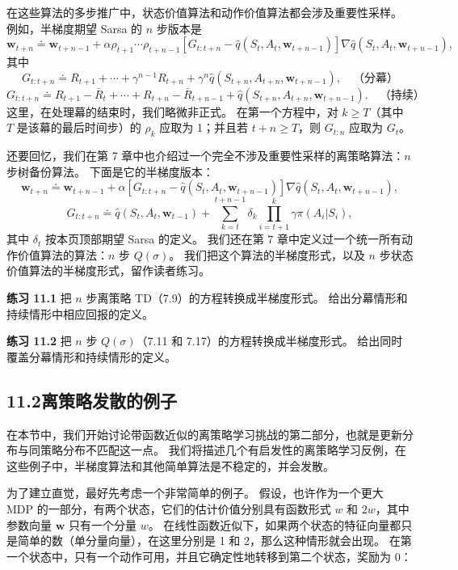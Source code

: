 \documentclass[UTF8,12pt,a4paper,fontset=fandol]{ctexart}
\begin{document}
在这些算法的多步推广中，状态价值算法和动作价值算法都会涉及重要性采样。
例如，半梯度期望 Sarsa 的 $n$ 步版本是
\begin{equation}
\mathbf{w}_{t+n}\doteq \mathbf{w}_{t+n-1}
+\alpha\rho_{t+1}\cdots\rho_{t+n-1}\left[G_{t:t+n}-\hat q(S_t,A_t,\mathbf{w}_{t+n-1})\right]\nabla\hat q(S_t,A_t,\mathbf{w}_{t+n-1}),
\tag{11.6}
\end{equation}
其中
\[
G_{t:t+n}\doteq R_{t+1}+\cdots+\gamma^{n-1}R_{t+n}
+\gamma^n\hat q(S_{t+n},A_{t+n},\mathbf{w}_{t+n-1}),\quad \text{（分幕）}
\]
\[
G_{t:t+n}\doteq R_{t+1}-\bar R_t+\cdots+R_{t+n}-\bar R_{t+n-1}
+\hat q(S_{t+n},A_{t+n},\mathbf{w}_{t+n-1}).\quad \text{（持续）}
\]
这里，在处理幕的结束时，我们略微非正式。
在第一个方程中，对 $k\ge T$（其中 $T$ 是该幕的最后时间步）的 $\rho_k$ 应取为 1；并且若 $t+n\ge T$，则 $G_{t:n}$ 应取为 $G_t$。

还要回忆，我们在第 7 章中也介绍过一个完全不涉及重要性采样的离策略算法：$n$ 步树备份算法。
下面是它的半梯度版本：
\begin{equation}
\mathbf{w}_{t+n}\doteq \mathbf{w}_{t+n-1}
+\alpha\left[G_{t:t+n}-\hat q(S_t,A_t,\mathbf{w}_{t+n-1})\right]\nabla\hat q(S_t,A_t,\mathbf{w}_{t+n-1}),
\tag{11.7}
\end{equation}
\begin{equation}
G_{t:t+n}\doteq \hat q(S_t,A_t,\mathbf{w}_{t-1})
+\sum_{k=t}^{t+n-1}\delta_k\prod_{i=t+1}^{k}\gamma\pi(A_i|S_i),
\tag{11.8}
\end{equation}
其中 $\delta_t$ 按本页顶部期望 Sarsa 的定义。
我们还在第 7 章中定义过一个统一所有动作价值算法的算法：$n$ 步 $Q(\sigma)$。
我们把这个算法的半梯度形式，以及 $n$ 步状态价值算法的半梯度形式，留作读者练习。

\noindent\textbf{练习 11.1}
把 $n$ 步离策略 TD（7.9）的方程转换成半梯度形式。
给出分幕情形和持续情形中相应回报的定义。

\noindent\textbf{练习 11.2}
把 $n$ 步 $Q(\sigma)$（7.11 和 7.17）的方程转换成半梯度形式。
给出同时覆盖分幕情形和持续情形的定义。

\subsection*{11.2\quad 离策略发散的例子}

在本节中，我们开始讨论带函数近似的离策略学习挑战的第二部分，也就是更新分布与同策略分布不匹配这一点。
我们将描述几个有启发性的离策略学习反例，在这些例子中，半梯度算法和其他简单算法是不稳定的，并会发散。

为了建立直觉，最好先考虑一个非常简单的例子。
假设，也许作为一个更大 MDP 的一部分，有两个状态，它们的估计价值分别具有函数形式 $w$ 和 $2w$，其中参数向量 $\mathbf{w}$ 只有一个分量 $w$。
在线性函数近似下，如果两个状态的特征向量都只是简单的数（单分量向量），在这里分别是 1 和 2，那么这种情形就会出现。
在第一个状态中，只有一个动作可用，并且它确定性地转移到第二个状态，奖励为 0：
\end{document}
